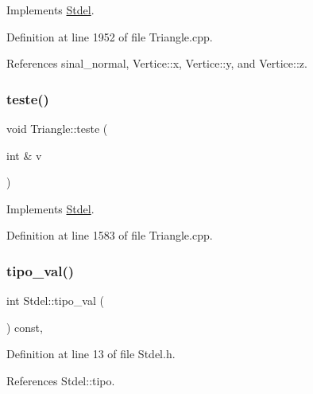 Implements \hyperlink{classStdel_a4e4aa3bbd0299054ec5447bd73efc6a0}{Stdel}.



Definition at line 1952 of file Triangle.\+cpp.



References sinal\+\_\+normal, Vertice\+::x, Vertice\+::y, and Vertice\+::z.

\mbox{\label{classTriangle_ab4de79168cc2bf7bf04634681f434610}} 
\subsubsection{\texorpdfstring{teste()}{teste()}}
{\footnotesize\ttfamily void Triangle\+::teste (\begin{DoxyParamCaption}\item[{int \&}]{v }\end{DoxyParamCaption})\hspace{0.3cm}{\ttfamily [virtual]}}



Implements \hyperlink{classStdel_ae62bc70bb31e48d165593ed1ecd482f8}{Stdel}.



Definition at line 1583 of file Triangle.\+cpp.

\mbox{\label{classStdel_a75023fc369db2752845a9ce278f10929}} 
\subsubsection{\texorpdfstring{tipo\+\_\+val()}{tipo\_val()}}
{\footnotesize\ttfamily int Stdel\+::tipo\+\_\+val (\begin{DoxyParamCaption}{ }\end{DoxyParamCaption}) const\hspace{0.3cm}{\ttfamily [inline]}, {\ttfamily [inherited]}}



Definition at line 13 of file Stdel.\+h.



References Stdel\+::tipo.

\mbox{\label{classTriangle_a1361a3e5ff11ed02786bf62325a2614f}} 
